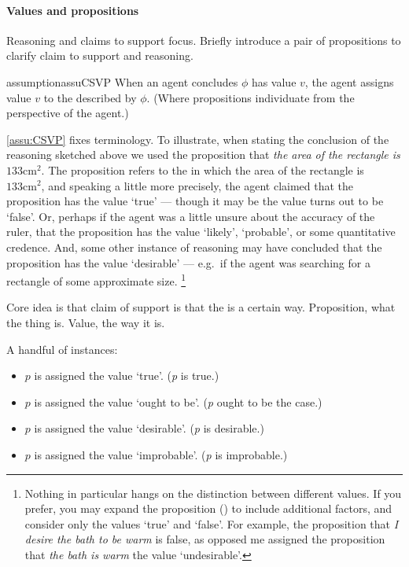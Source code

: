 \paragraph{Values and propositions}

\begin{note}
  Reasoning and claims to support focus.
  Briefly introduce a pair of propositions to clarify claim to support and reasoning.

  \begin{restatable}{assumption}{assuCSVP}
    \label{assu:CSVP}
    When an agent concludes \(\phi\) has value \(v\), the agent assigns value \(v\) to the  described by \(\phi\).
    (Where propositions individuate  from the perspective of the agent.)
  \end{restatable}

  \autoref{assu:CSVP} fixes terminology.
  To illustrate, when stating the conclusion of the reasoning sketched above we used the proposition that \emph{the area of the rectangle is \(133\text{cm}^{2}\)}.
  The proposition refers to the \world{} in which the area of the rectangle is \(133\text{cm}^{2}\), and speaking a little more precisely, the agent claimed that the proposition has the value `true' --- though it may be the value turns out to be `false'.
  Or, perhaps if the agent was a little unsure about the accuracy of the ruler, that the proposition has the value `likely', `probable', or some quantitative credence.
  And, some other instance of reasoning may have concluded that the proposition has the value `desirable' --- e.g.\ if the agent was searching for a rectangle of some approximate size.\nolinebreak
  \footnote{
    Nothing in particular hangs on the distinction between different values.
    If you prefer, you may expand the proposition (\world{}) to include additional factors, and consider only the values `true' and `false'.
    For example, the proposition that \emph{I desire the bath to be warm} is false, as opposed me assigned the proposition that \emph{the bath is warm} the value `undesirable'.
  }
\end{note}

\begin{note}
  Core idea is that claim of support is that the \world{} is a certain way.
  Proposition, what the thing is.
  Value, the way it is.

  A handful of instances:
  \begin{itemize}
  \item \(p\) is assigned the value `true'. \hfill (\emph{p} is true.)
  \item \(p\) is assigned the value `ought to be'. \hfill (\emph{p} ought to be the case.)
  \item \(p\) is assigned the value `desirable'. \hfill (\emph{p} is desirable.)
  \item \(p\) is assigned the value `improbable'. \hfill (\emph{p} is improbable.)
  \end{itemize}
\end{note}

